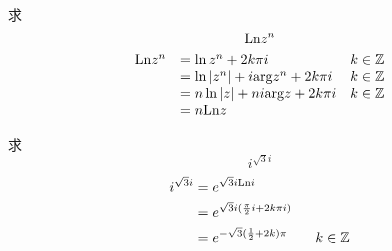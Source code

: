 \begin{homeworkProblem}
    求\[\mathrm{Ln} z^n\]
\solution
\[\begin{array} {lll}
\mathrm{Ln} z^n &= \ln z^n + 2k\pi i & k\in\mathbb{Z}\\
&= \ln|z^n| + i\mathrm{arg} z^n + 2k\pi i & k\in\mathbb{Z} \\
&= n\ln|z| + ni\mathrm{arg} z + 2k\pi i & k\in\mathbb{Z} \\
&= n\mathrm{Ln} z
\end{array}\]
\end{homeworkProblem}

\begin{homeworkProblem}
求
\[i^{\sqrt3i}\]
\solution
\[\begin{split}
i^{\sqrt3i} &=
e^{\sqrt3i\mathrm{Ln} i}\\
&= e^{\sqrt3i(\frac{\pi}{2}i + 2k\pi i)} \\
&= e^{-\sqrt3(\frac{1}{2}+2k)\pi}\qquad k\in\mathbb{Z}
\end{split}\]
\end{homeworkProblem}
\newpage
